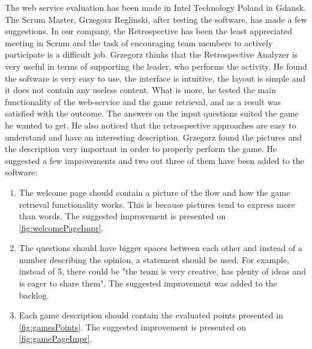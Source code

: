 The web service evaluation has been made in Intel Technology Poland in Gdansk. The Scrum Master, Grzegorz Reglinski, after testing the software, has made a few suggestions. In our company, the Retrospective has been the least appreciated meeting in Scrum and the task of encouraging team members to actively participate is a difficult job. Grzegorz thinks that the Retrospective Analyzer is very useful in terms of supporting the leader, who performs the activity. He found the software is very easy to use, the interface is intuitive, the layout is simple and it does not contain any useless content. What is more, he tested the main functionality of the web-service and the game retrieval, and as a result was satisfied with the outcome. The answers on the input questions suited the game he wanted to get. He also noticed that the retrospective approaches are easy to understand and have an interesting description. Grzegorz found the pictures and the description very important in order to properly perform the game. He suggested a few improvements and two out three of them have been added to the software: 
\begin{enumerate}
    \item The welcome page should contain a picture of the flow and how the game retrieval functionality works. This is because pictures tend to express more than words. The suggested improvement is presented on \autoref{fig:welcomePageImpr}.
    \item The questions should have bigger spaces between each other and instead of a number describing the opinion, a statement should be used. For example, instead of 5, there could be "the team is very creative, has plenty of ideas and is eager to share them". The suggested improvement was added to the backlog.
    \item Each game description should contain the evaluated points presented in \autoref{fig:gamesPoints}. The suggested improvement is presented on \autoref{fig:gamePageImpr}.
\end{enumerate}

